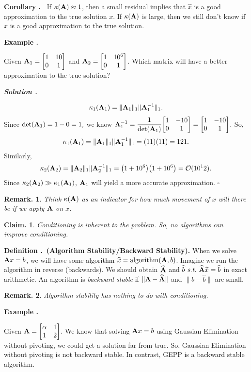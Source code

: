 \documentclass[12pt, a4paper]{article}
\newcounter{index}[subsection]
\newenvironment*{df}[1]{\par\noindent\textbf{Definition \thesubsection.\stepcounter{index}\theindex\ (#1).}}{\par}
\newenvironment*{eg}[1]{\begin{framed}\par\noindent\textbf{Example \thesubsection.\stepcounter{index}\theindex\ #1} \par}{\par\end{framed}}
\newenvironment*{cor}[1]{\par\noindent\textbf{Corollary \thesubsection.\stepcounter{index}\theindex\ #1}}{\par}
\newcounter{nprf}[subsection]
\newenvironment*{sol}{\par\indent\textbf{\textit{Solution \stepcounter{nprf}\thenprf.}}\par}{\hfill{$\square$}\par}
\newtheorem{rmk}{Remark.}[section]
\newtheorem{clm}{Claim.}[section]
\def\A{\vb A}
\def\bigO{\mathcal{O}}
\def\st{\emph{\ s.t.\ }}
\def\hat{\widehat}
\begin{document}
\begin{cor}{}
	If $\kappa(\A)\approx1$, then a small residual implies that $\hat{x}$ is a good approximation to the true solution $x$. If $\kappa(\A)$ is large, then we still don't know if $\hat{x}$ is a good approximation to the true solution. 
\end{cor}
\begin{eg}{}
	Given $\A_1=\mqty[1&10\\0&1]$ and $\A_2=\mqty[1&10^6\\0&1]$. Which matrix will have a better approximation to the true solution? 
	\begin{sol}
		\[\kappa_1(\A_1)=\|\A_1\|_1\|\A^{-1}_1\|_1.\] Since $\det(\A_1)=1-0=1,$ we know $\A_1^{-1}=\dfrac{1}{\det(\A_1)}\mqty[1&-10\\0&1]=\mqty[1&-10\\0&1].$ So, \[\kappa_1(\A_1)=\|\A_1\|_1\|\A^{-1}_1\|_1=(11)(11)=121.\] Similarly, \[\kappa_2(\A_2)=\|\A_2\|_1\|\A_2^{-1}\|_1=\qty(1+10^6)\qty(1+10^6)=\bigO(10^12).\] Since $\kappa_2(\A_2)\gg\kappa_1(\A_1)$, $\A_1$ will yield a more accurate approximation.
	\end{sol}
	\begin{rmk}
		Think $\kappa(\A)$ as an indicator for how much movement of $x$ will there be if we apply $\A$ on $x$.	
	\end{rmk}
\end{eg}
\begin{clm}
	Conditioning is inherent to the problem. So, no algorithms can improve conditioning.
\end{clm}
\begin{df}{Algorithm Stability/Backward Stability}
	When we solve $\A x=b$, we will have some algorithm $\hat{x}=\text{algorithm}(\A,b)$. Imagine we run the algorithm in reverse (backwards). We should obtain $\hat{\A}$ and $\hat{b}\st\hat{\A}\hat{x}=\hat{b}$ in exact arithmetic. An algorithm is \textit{backward stable} if $\|\A-\hat{\A}\|$ and $\|b-\hat{b}\|$ are small.	
\end{df}
\begin{rmk}
	Algorithm stability has nothing to do with conditioning.	
\end{rmk}
\begin{eg}{}
	Given $\A=\mqty[\alpha&1\\1&2]$. We know that solving $\A x=b$ using Gaussian Elimination without pivoting, we could get a solution far from true. So, Gaussian Elimination without pivoting is not backward stable. In contrast, GEPP is a backward stable algorithm. 
\end{eg}
\end{document}
